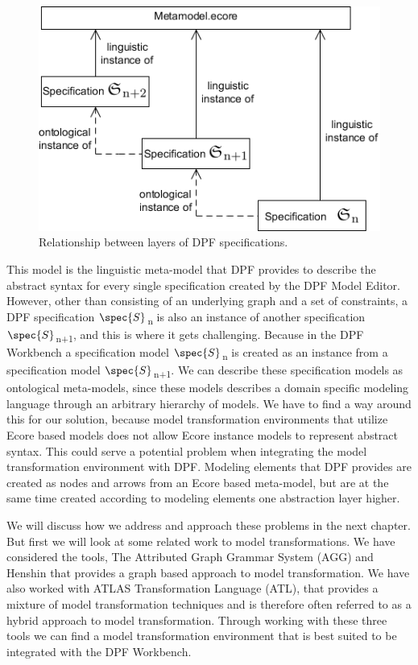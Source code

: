 \begin{figure}[H]
	\centering
	\includegraphics[scale=0.7]{./Figures/metamodelSpecification_1.png}
	\caption[Specification relationship with core meta-model]
	{Relationship between layers of DPF specifications.}
	\label{fig:core_metamodel}
\end{figure}

This model is the linguistic meta-model that DPF provides to describe the
abstract syntax for every single specification created by the DPF Model Editor.
However, other than consisting of an underlying graph and a set of constraints,
a DPF specification $\spec{S}$\textsubscript{n} is also an instance of another
specification$\spec{S}$\textsubscript{n+1}, and this is where it gets
challenging. Because in the DPF Workbench a specification model
$\spec{S}$\textsubscript{n} is created as an instance from a specification model
$\spec{S}$\textsubscript{n+1}. We can describe these specification models as
ontological meta-models, since these models describes a domain specific modeling
language through an arbitrary hierarchy of models. We have to find
a way around this for our solution, because model transformation environments
that utilize Ecore based models does not allow Ecore instance models to represent
abstract syntax. This could serve a potential problem when integrating the model
transformation environment with DPF. Modeling elements that DPF provides are
created as nodes and arrows from an Ecore based meta-model, but are at the same
time created according to modeling elements one abstraction layer higher.

We will discuss how we address and approach these problems in the next
chapter. But first we will look at some related work to model transformations.
We have considered the tools, The Attributed Graph Grammar
System\cite{Taentzer2004} (AGG) and Henshin\cite{Henshin_2010} that provides a
graph based approach to model transformation. We have also worked with ATLAS
Transformation Language\cite{ATL_USERMAN} (ATL), that provides a mixture of
model transformation techniques and is therefore often referred to as a hybrid
approach to model transformation. Through working with these three tools we can
find a model transformation environment that is best suited to be integrated
with the DPF Workbench.

